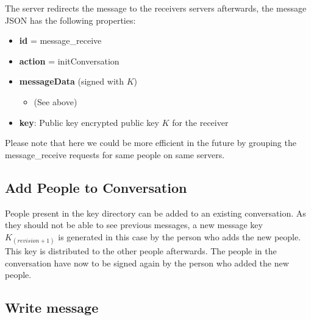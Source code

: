 \documentclass{scrartcl}
\begin{document}
The server redirects the message to the receivers servers afterwards, the message JSON has the following properties:

\begin{itemize}
    \item \textbf{id} = message\_receive
    \item \textbf{action} = initConversation
    \item \textbf{messageData} (signed with $K$)
    \begin{itemize}
    \item (See above)

    \end{itemize}
    \item \textbf{key}: Public key encrypted public key $K$ for the receiver
\end{itemize}

Please note that here we could be more efficient in the future by grouping the message\_receive requests for same people on same servers.


%            
            
            
            
\subsection{Add People to Conversation}
People present in the key directory can be added to an existing conversation.
As they should not be able to see previous messages, a new message key $K_{(revision+1)}$ is generated in this case by the person who adds the new people.
This key is distributed to the other people afterwards. The people in the conversation have now to be signed again by the person who added the new people.

\subsection{Write message}
\end{document}
